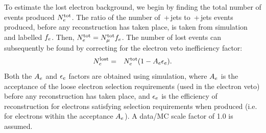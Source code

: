 To estimate the lost electron background, we begin by finding the total number of \wenu events produced $N^{\rm tot}_{e}$.
The ratio of the number of \wmunubr{}\,+\,jets to \wenubr\,+\,jets events produced, before any reconstruction has taken place, is taken from simulation and labelled $f_{e}$.  
Then, $N^{\rm tot}_{e} = N^{\rm tot}_{\mu}  f_{e}$. 
The number of lost \wenu events can subsequently be found by correcting for the electron veto inefficiency factor:
\begin{eqnarray}
N^{\rm lost}_{e} &=& N^{\rm tot}_{e}(1 - A_{e}\epsilon_{e}).
\end{eqnarray}
Both the $A_{e}$ and $\epsilon_{e}$ factors are obtained using simulation, where $A_{e}$ is the acceptance of the loose electron selection requirements (used in the electron veto) before any reconstruction has taken place, 
and $\epsilon_{e}$ is the efficiency of reconstruction for electrons satisfying selection requirements when produced (i.e. for electrons within the acceptance $A_{e}$).
A data/MC scale factor of 1.0 is assumed. %

